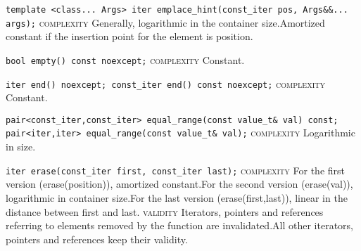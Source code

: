 \noindent{}\hspace*{0.25em}\lstinline[basicstyle=\ttfamily\color{clime}]{template <class... Args> iter emplace_hint(const_iter pos, Args&&... args);} \textsc{complexity} Generally, logarithmic in the container size.Amortized constant if the insertion point for the element is position.\\\vspace{-0.6em}

\noindent{}\hspace*{0.25em}\lstinline[basicstyle=\ttfamily\color{cgreen}]{bool empty() const noexcept;} \textsc{complexity} Constant.\\\vspace{-0.6em}

\noindent{}\hspace*{0.25em}\lstinline[basicstyle=\ttfamily\color{cgreen}]{iter end() noexcept; const_iter end() const noexcept;} \textsc{complexity} Constant.\\\vspace{-0.6em}

\noindent{}\hspace*{0.25em}\lstinline[basicstyle=\ttfamily\color{clime}]{pair<const_iter,const_iter> equal_range(const value_t& val) const; pair<iter,iter> equal_range(const value_t& val);} \textsc{complexity} Logarithmic in size.\\\vspace{-0.6em}

\noindent{}\hspace*{0.25em}\lstinline[basicstyle=\ttfamily\color{corange}]{iter erase(const_iter first, const_iter last);} \textsc{complexity} For the first version (erase(position)), amortized constant.For the second version (erase(val)), logarithmic in container size.For the last version (erase(first,last)), linear in the distance between first and last. \textsc{validity} Iterators, pointers and references referring to elements removed by the function are invalidated.All other iterators, pointers and references keep their validity.\\\vspace{-0.6em}


